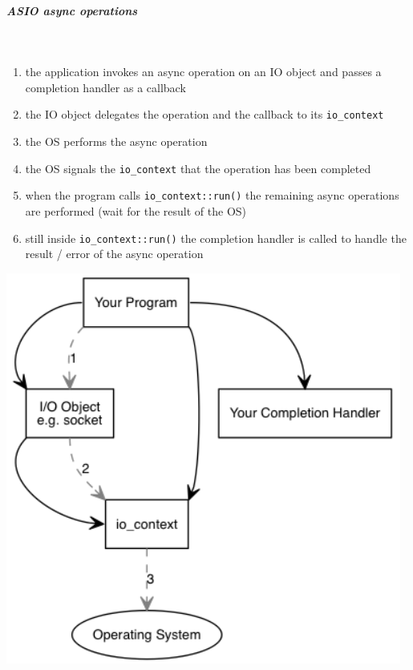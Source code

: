 \documentclass[11pt,twoside,landscape]{article}
\begin{document}
\begin{multicols}{2}
\subparagraph{ASIO async operations} \
\label{sec:org2d843f6}
\begin{enumerate}
\item the application invokes an async operation on an IO object and passes a completion handler as a callback
\item the IO object delegates the operation and the callback to its \texttt{io\_context}
\item the OS performs the async operation
\item the OS signals the \texttt{io\_context} that the operation has been completed
\item when the program calls \texttt{io\_context::run()} the remaining async operations are performed (wait for the result of the OS)
\item still inside \texttt{io\_context::run()} the completion handler is called to handle the result / error of the async operation
\end{enumerate}


{
\begin{center}
\includegraphics[width=.9\linewidth]{img/asio_async_operation.png}
\end{center}
\label{fig:asio-async-operations-part-1}
}


\end{multicols}
\end{document}
